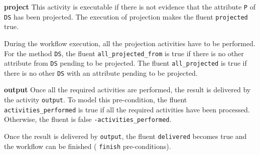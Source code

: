 %


\vspace*{0.25cm}
\textbf{project} This activity is executable if there is not evidence that the attribute \texttt{P} of \texttt{DS} has been projected. The execution of projection makes the fluent \texttt{projected} true.
               
%


\vspace*{0.25cm}
During the workflow execution, all the projection activities have to  be performed. For the method \texttt{DS}, the fluent \texttt{all\_projected\_from} is true if there is no other attribute from \texttt{DS} pending to be projected. The fluent \texttt{all\_projected} is true if there is no other \texttt{DS} with an attribute pending to be projected.
                
%


\vspace*{0.25cm}                  
\textbf{output} Once all the required activities are performed, the result is delivered by the activity \texttt{output}. To model this pre-condition, the fluent \texttt{activities\_performed} is true if all the required activities have been processed. Otherwise, the fluent is false \texttt{-activities\_performed}.

%


\vspace*{0.25cm}
Once the result is delivered by \texttt{output}, the fluent \texttt{delivered} becomes true and the workflow can be finished (\cf{} \texttt{finish} pre-conditions).

%






